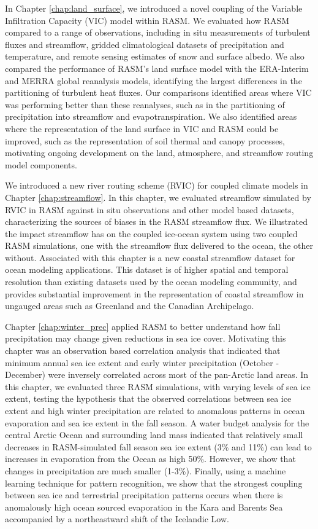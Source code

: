In Chapter \ref{chap:land_surface}, we introduced a novel coupling of the Variable Infiltration Capacity (VIC) model within RASM.
We evaluated how RASM compared to a range of observations, including in situ measurements of turbulent fluxes and streamflow, gridded climatological datasets of precipitation and temperature, and remote sensing estimates of snow and surface albedo.
We also compared the performance of RASM's land surface model with the ERA-Interim and MERRA global reanalysis models, identifying the largest differences in the partitioning of turbulent heat fluxes.
Our comparisons identified areas where VIC was performing better than these reanalyses, such as in the partitioning of precipitation into streamflow and evapotranspiration.
We also identified areas where the representation of the land surface in VIC and RASM could be improved, such as the representation of soil thermal and canopy processes, motivating ongoing development on the land, atmosphere, and streamflow routing model components.

We introduced a new river routing scheme (RVIC) for coupled climate models in Chapter \ref{chap:streamflow}.
In this chapter, we evaluated streamflow simulated by RVIC in RASM against in situ observations and other model based datasets, characterizing the sources of biases in the RASM streamflow flux.
We illustrated the impact streamflow has on the coupled ice-ocean system using two coupled RASM simulations, one with the streamflow flux delivered to the ocean, the other without.
Associated with this chapter is a new coastal streamflow dataset for ocean modeling applications.
This dataset is of higher spatial and temporal resolution than existing datasets used by the ocean modeling community, and provides substantial improvement in the representation of coastal streamflow in ungauged areas such as Greenland and the Canadian Archipelago.

Chapter \ref{chap:winter_prec} applied RASM to better understand how fall precipitation may change given reductions in sea ice cover.
Motivating this chapter was an observation based correlation analysis that indicated that minimum annual sea ice extent and early winter precipitation (October - December) were inversely correlated across most of the pan-Arctic land areas.
In this chapter, we evaluated three RASM simulations, with varying levels of sea ice extent, testing the hypothesis that the observed correlations between sea ice extent and high winter precipitation are related to anomalous patterns in ocean evaporation and sea ice extent in the fall season.
A water budget analysis for the central Arctic Ocean and surrounding land mass indicated that relatively small decreases in RASM-simulated fall season sea ice extent (3\% and 11\%) can lead to increases in evaporation from the Ocean as high 50\%.
However, we show that changes in precipitation are much smaller (1-3\%).
Finally, using a machine learning technique for pattern recognition, we show that the strongest coupling between sea ice and terrestrial precipitation patterns occurs when there is anomalously high ocean sourced evaporation in the Kara and Barents Sea accompanied by a northeastward shift of the Icelandic Low.

